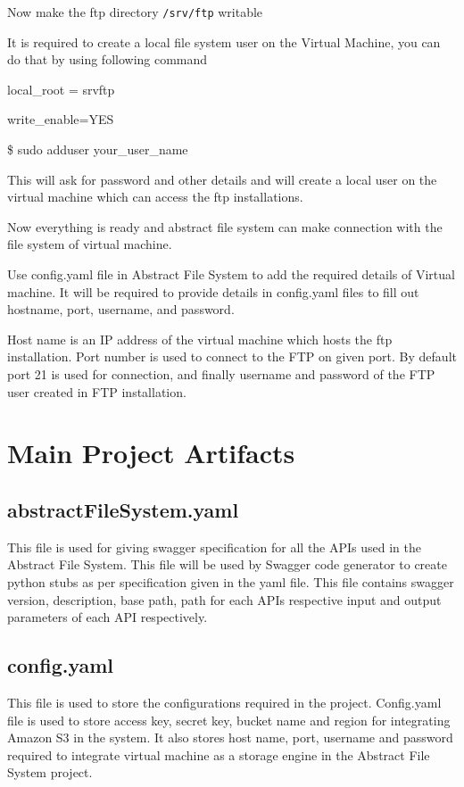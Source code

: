 
Now make the ftp directory \verb|/srv/ftp| writable 


It is required to create a local file system user on the Virtual Machine, you 
can do that by using following command

	
local\_root = \/srv\/ftp  


write\_enable=YES       


\$ sudo adduser your\_user\_name    


This will ask for password and other details and will create a local user on 
the virtual machine which can access the ftp installations.

Now everything is ready and abstract file system can make connection with the 
file system of virtual machine.





Use config.yaml file in Abstract File System to add the required
details of Virtual machine.  It will be required to provide details in
config.yaml files to fill out hostname, port, username, and password.


Host name is an IP address of the virtual machine which hosts the ftp 
installation. Port number is used to connect to the FTP on given port. By 
default port 21 is used for connection, and finally username and password of 
the FTP user created in FTP installation.





\section{Main Project Artifacts}


\subsection{abstractFileSystem.yaml}

This file is used for giving swagger specification for all the APIs used in 
the Abstract File System. This file will be used by Swagger code generator to 
create python stubs as per specification given in the yaml file.
This file contains swagger version, description, base path, path for each APIs 
respective input and output parameters of each API respectively.

\subsection{config.yaml}
This file is used to store the configurations required in the project. 
Config.yaml file is used to store access key, secret key, bucket name and 
region for integrating Amazon S3 in the system. It also stores host name, 
port, username and password required to integrate virtual machine as a storage 
engine in the Abstract File System project.

